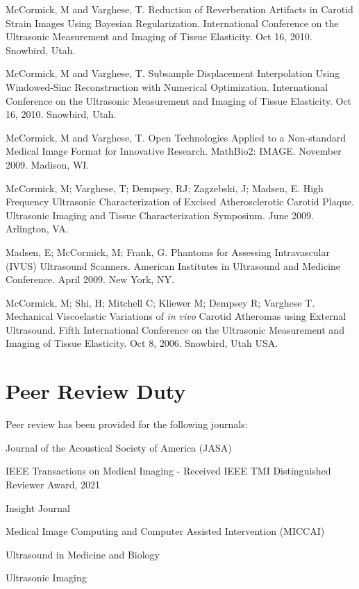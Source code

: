 \documentclass[margin,line]{res}
\newenvironment{list1}{
  \begin{list}{\ding{113}}{%
      \setlength{\itemsep}{0in}
      \setlength{\parsep}{0in} \setlength{\parskip}{0in}
      \setlength{\topsep}{0in} \setlength{\partopsep}{0in}
      \setlength{\leftmargin}{0.17in}}}{\end{list}}
\begin{document}
\begin{resume}
McCormick, M and Varghese, T.  Reduction of Reverberation Artifacts in Carotid
Strain Images Using Bayesian Regularization.  International Conference on the
Ultrasonic Measurement and Imaging of Tissue Elasticity.  Oct 16, 2010.
Snowbird, Utah.

McCormick, M and Varghese, T.  Subsample Displacement Interpolation Using
Windowed-Sinc Reconstruction with Numerical Optimization.  International
Conference on the Ultrasonic Measurement and Imaging of Tissue Elasticity.  Oct
16, 2010.  Snowbird, Utah.

McCormick, M and Varghese, T.  Open Technologies Applied to a Non-standard Medical
Image Format for Innovative Research.  MathBio2: IMAGE.  November 2009.  Madison, WI.

McCormick, M; Varghese, T; Dempsey, RJ; Zagzebski, J; Madsen, E.  High Frequency Ultrasonic Characterization of Excised Atherosclerotic
Carotid Plaque.  Ultrasonic Imaging and Tissue Characterization
Symposium.  June 2009.  Arlington, VA.

Madsen, E;  McCormick, M;  Frank, G.  Phantoms for Assessing
Intravascular (IVUS) Ultrasound Scanners.  American Institutes in
Ultrasound and Medicine Conference.  April 2009.  New York, NY.

McCormick, M; Shi, H; Mitchell C; Kliewer M; Dempsey R; Varghese T.   Mechanical
Viscoelastic Variations of \textit{in vivo} Carotid Atheromas using External
Ultrasound.  Fifth International Conference on the Ultrasonic Measurement and
Imaging of Tissue Elasticity.  Oct 8, 2006.  Snowbird, Utah USA.


\section{\sc Peer Review Duty}

Peer review has been provided for the following journals:

\begin{list1}
\item[] Journal of the Acoustical Society of America (JASA)
\item[] IEEE Transactions on Medical Imaging - Received IEEE TMI Distinguished Reviewer Award, 2021
\item[] Insight Journal
\item[] Medical Image Computing and Computer Assisted Intervention (MICCAI)
\item[] Ultrasound in Medicine and Biology
\item[] Ultrasonic Imaging
\end{list1}


\end{resume}
\end{document}
